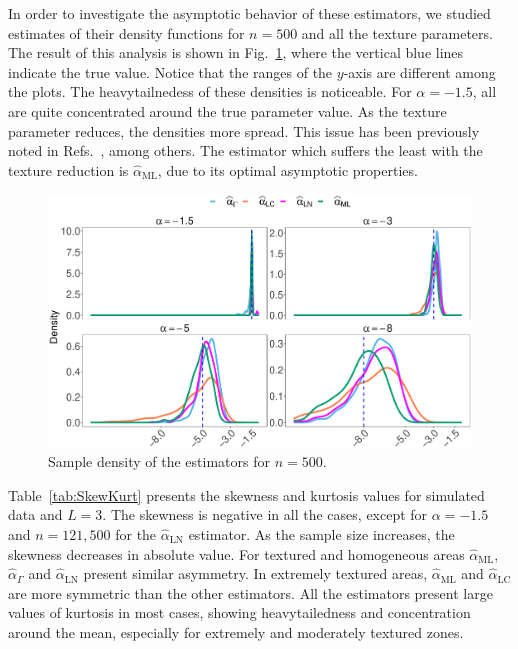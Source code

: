\documentclass[twocolumn]{svjour3}
\begin{document}
	In order to investigate the asymptotic behavior of these estimators, we studied estimates of their density functions for $n=500$ and all the texture parameters. 
	The result of this analysis is shown in Fig.~\ref{Fig:Densities_n500}, where
	the vertical blue lines indicate the true value. 
	Notice that the ranges of the $y$-axis are different among the plots. 
	The heavytailnedess of these densities is noticeable.
	For $\alpha=-1.5$, all are quite concentrated around the true parameter value. 
	As the texture parameter reduces, the densities more spread.
	This issue has been previously noted in Refs.~\cite{APSAR2013ParameterEstimationStochasticDistances,CribariFrerySilva:CSDA,AllendeFreryetal:JSCS:05,FreryCribariSouza:JASP:04}, among others.
	The estimator which suffers the least with the texture reduction is $\widehat{\alpha}_{\text{{ML}}}$, due to its optimal asymptotic properties.      
	
	\begin{figure}[hbt]
		\centering
		\includegraphics[width=1\linewidth]{Asymptotic_n500_TodoAlfa}
		\caption{\label{Fig:Densities_n500} Sample density of the estimators for $n=500$. }
	\end{figure}
	
	Table~\ref{tab:SkewKurt} presents the skewness and kurtosis values for simulated data and $L=3$. 
	The skewness is negative in all the cases, except for $\alpha=-1.5$ and $n=121,500$ for the $\widehat{\alpha}_{\text{{LN}}}$ estimator. 
	As the sample size increases, the skewness decreases in absolute value. 
	For textured and homogeneous areas $\widehat{\alpha}_{\text{{ML}}}$, $\widehat{\alpha}_{\Gamma}$ and $\widehat{\alpha}_{\text{{LN}}}$ present similar asymmetry. 
	In extremely textured areas, $\widehat{\alpha}_{\text{{ML}}}$ and $\widehat{\alpha}_{\text{{LC}}}$ are more symmetric than the other estimators.
	All the estimators present large values of kurtosis in most cases, showing heavytailedness and concentration around the mean, especially for extremely and moderately textured zones.
	
\end{document}
